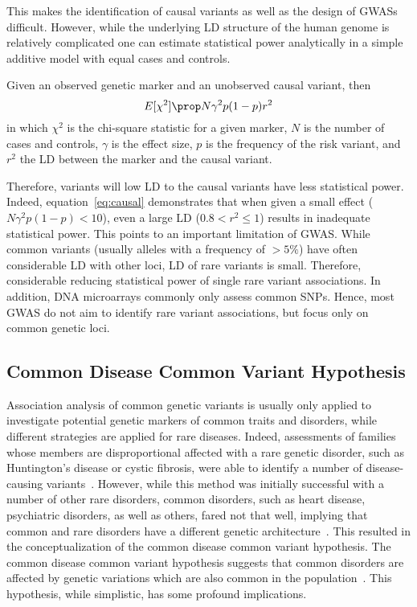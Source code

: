This makes the identification of causal variants as well as the design of GWASs difficult.
However, while the underlying LD structure of the human genome is relatively complicated one can estimate statistical power analytically in a simple additive model with equal cases and controls.

Given an observed genetic marker and an unobserved causal variant, then
\begin{equation}\label{eq:causal}
  E[\chi^2] \prop N\gamma^2p(1-p)r^2
\end{equation}
in which $\chi^2$ is the chi-square statistic for a given marker, $N$ is the number of cases and controls, $\gamma$ is the effect size, $p$ is the frequency of the risk variant, and $r^2$ the LD between the marker and the causal variant.

Therefore, variants will low LD to the causal variants have less statistical power.
Indeed, equation~\ref{eq:causal} demonstrates that when given a small effect ($N\gamma^2p(1-p) < 10$), even a large LD ($0.8  < r^2 \leq 1$) results in inadequate statistical power.
This points to an important limitation of GWAS.
While common variants (usually alleles with a frequency of $>5\%$) have often considerable LD with other loci, LD of rare variants is small.
Therefore, considerable reducing statistical power of single rare variant associations.
In addition, DNA microarrays commonly only assess common SNPs.
Hence, most GWAS do not aim to identify rare variant associations, but focus only on common genetic loci.

\subsection{Common Disease Common Variant Hypothesis}
\label{sub:common_versus_rare_genetic_variants}

Association analysis of common genetic variants is usually only applied to investigate potential genetic markers of common traits and disorders, while different strategies are applied for rare diseases.
Indeed, assessments of families whose members are disproportional affected with a rare genetic disorder, such as Huntington's disease or cystic fibrosis, were able to identify a number of disease-causing variants~\cite{Kerem1989}.
However, while this method was initially successful with a number of other rare disorders, common disorders, such as heart disease, psychiatric disorders, as well as others, fared not that well,  
implying that common and rare disorders have a different genetic architecture~\cite{Hirschhorn2005a}.
This resulted in the conceptualization of the common disease common variant hypothesis.
The common disease common variant hypothesis suggests that common disorders are affected by genetic variations which are also common in the population~\cite{Schork2010}.
This hypothesis, while simplistic, has some profound implications.

